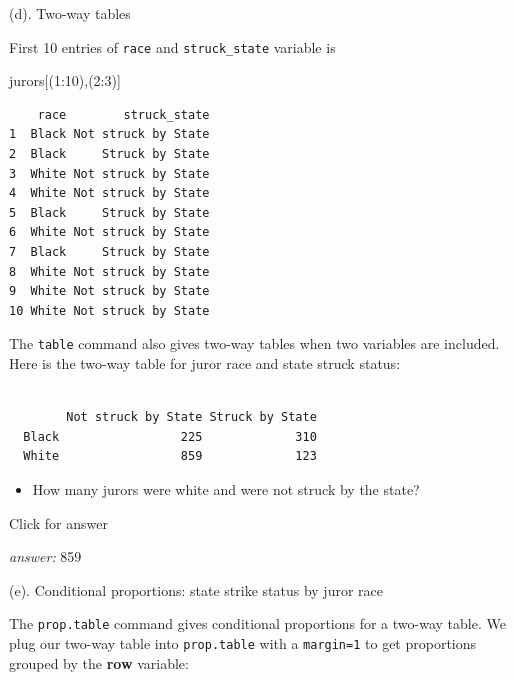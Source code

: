 \documentclass[
]{book}
\newenvironment{Shaded}{\begin{snugshade}}{\end{snugshade}}
\newcommand{\DecValTok}[1]{\textcolor[rgb]{0.00,0.00,0.81}{#1}}
\newcommand{\FunctionTok}[1]{\textcolor[rgb]{0.00,0.00,0.00}{#1}}
\newcommand{\NormalTok}[1]{#1}
\newcommand{\OtherTok}[1]{\textcolor[rgb]{0.56,0.35,0.01}{#1}}
\newcommand{\SpecialCharTok}[1]{\textcolor[rgb]{0.00,0.00,0.00}{#1}}
\providecommand{\tightlist}{%
  \setlength{\itemsep}{0pt}\setlength{\parskip}{0pt}}
\begin{document}
(d). Two-way tables

First 10 entries of \texttt{race} and \texttt{struck\_state} variable is

\begin{Shaded}
\begin{Highlighting}[]
\NormalTok{jurors[(}\DecValTok{1}\SpecialCharTok{:}\DecValTok{10}\NormalTok{),(}\DecValTok{2}\SpecialCharTok{:}\DecValTok{3}\NormalTok{)]}
\end{Highlighting}
\end{Shaded}

\begin{verbatim}
    race        struck_state
1  Black Not struck by State
2  Black     Struck by State
3  White Not struck by State
4  White Not struck by State
5  Black     Struck by State
6  White Not struck by State
7  Black     Struck by State
8  White Not struck by State
9  White Not struck by State
10 White Not struck by State
\end{verbatim}

The \texttt{table} command also gives two-way tables when two variables are included. Here is the two-way table for juror race and state struck status:

\begin{Shaded}
\end{Shaded}

\begin{verbatim}
       
        Not struck by State Struck by State
  Black                 225             310
  White                 859             123
\end{verbatim}

\begin{itemize}
\tightlist
\item
  How many jurors were white and were not struck by the state?
\end{itemize}

Click for answer

\emph{answer:} 859

(e). Conditional proportions: state strike status by juror race

The \texttt{prop.table} command gives conditional proportions for a two-way table. We plug our two-way table into \texttt{prop.table} with a \texttt{margin=1} to get proportions grouped by the \textbf{row} variable:
\end{document}
